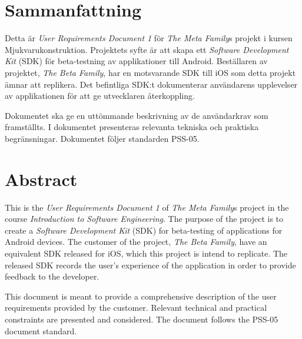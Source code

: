 \section*{Sammanfattning} %
Detta är \textit{User Requirements Document 1} för \textit{The Meta Family}s projekt i kursen Mjukvarukonstruktion. Projektets syfte är att skapa ett \textit{Software Development Kit} (SDK) för beta-testning av applikationer till Android. Beställaren av projektet, \textit{The Beta Family}, har en motsvarande SDK till iOS som detta projekt ämnar att replikera. Det befintliga SDK:t dokumenterar användarens upplevelser av applikationen för att ge utvecklaren återkoppling.

Dokumentet ska ge en uttömmande beskrivning av de användarkrav som framställts. I dokumentet presenteras relevanta tekniska och praktiska begränsningar. Dokumentet följer standarden PSS-05.

\section*{Abstract}
This is the \textit{User Requirements Document 1} of \textit{The Meta Family}s project in the course \textit{Introduction to Software Engineering}. The purpose of the project is to create a \textit{Software Development Kit} (SDK) for beta-testing of applications for Android devices. The customer of the project, \textit{The Beta Family}, have an equivalent SDK released for iOS, which this project is intend to replicate. The released SDK records the user's experience of the application in order to provide feedback to the developer.

This document is meant to provide a comprehensive description of the user requirements provided by the customer. Relevant technical and practical constraints are presented and considered. The document follows the PSS-05 document standard.
